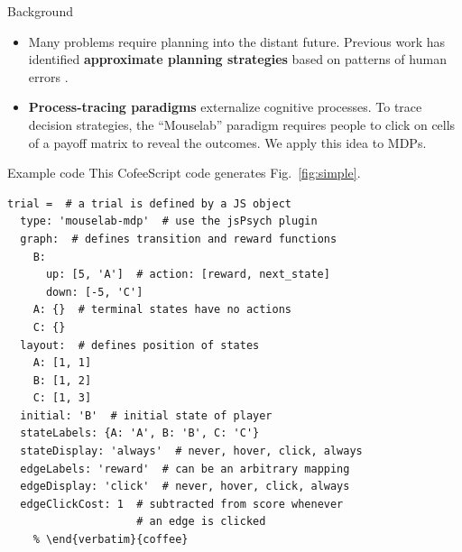 \documentclass[final]{beamer}
\newlength{\onecolwid}
\begin{document}
\begin{frame}[t, fragile]
\begin{columns}[t]
\begin{column}{\onecolwid}
  \begin{block}{Background}\label{Background}
    \begin{itemize}
      \item Many problems require planning into the distant future.
            Previous work has identified %
            \textbf{approximate planning strategies} based on patterns of human errors \cite{Huys2015}.
      \item \textbf{Process-tracing paradigms} externalize cognitive processes.
            To trace decision strategies, the ``Mouselab'' paradigm \cite{Payne1988} requires people to click on cells of a payoff matrix to reveal the outcomes. We apply this idea to MDPs.
    \end{itemize}

    

  \end{block}

  \begin{block}{Example code}\label{usage}
    This CofeeScript code generates Fig.~\ref{fig:simple}.
    \begin{Verbatim}[fontsize=\small]
    % \begin{verbatim}
trial =  # a trial is defined by a JS object
  type: 'mouselab-mdp'  # use the jsPsych plugin
  graph:  # defines transition and reward functions
    B:
      up: [5, 'A']  # action: [reward, next_state]
      down: [-5, 'C']
    A: {}  # terminal states have no actions
    C: {}
  layout:  # defines position of states
    A: [1, 1]
    B: [1, 2]
    C: [1, 3]
  initial: 'B'  # initial state of player
  stateLabels: {A: 'A', B: 'B', C: 'C'}
  stateDisplay: 'always'  # never, hover, click, always
  edgeLabels: 'reward'  # can be an arbitrary mapping
  edgeDisplay: 'click'  # never, hover, click, always
  edgeClickCost: 1  # subtracted from score whenever
                    # an edge is clicked
    % \end{verbatim}{coffee}
    \end{Verbatim}
  \end{block}

\end{column} %


\end{columns}
\end{frame}
\end{document}
